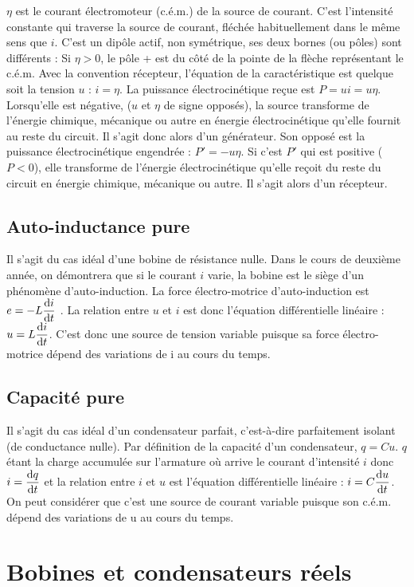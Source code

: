 $\eta$ est le courant électromoteur (c.é.m.) de la source de courant. C'est l'intensité constante qui traverse la source de courant, fléchée habituellement dans le même sens que $i$.
C'est un dipôle actif, non symétrique, ses deux bornes (ou pôles) sont différents : Si $\eta > 0$, le pôle + est du côté de la pointe de la flèche représentant le c.é.m. Avec la convention récepteur, l'équation de la caractéristique est quelque soit la tension $u$ : $i=\eta$. La puissance électrocinétique reçue est $P  = u i = u \eta$. Lorsqu'elle est négative, ($u$ et $\eta$ de signe opposés), la source transforme de l'énergie chimique, mécanique ou autre en énergie électrocinétique qu'elle fournit au reste du circuit. Il s'agit donc alors d'un générateur. Son opposé est la puissance électrocinétique engendrée : $P' = -u\eta$. Si c'est $P'$ qui est positive ($P  < 0$), elle transforme de l'énergie électrocinétique qu'elle reçoit du reste du circuit en énergie chimique, mécanique ou autre. Il s'agit alors d'un récepteur.

\subsection{Auto-inductance pure}

Il s'agit du cas idéal d'une bobine de résistance nulle. Dans le cours de deuxième année, on démontrera que si le courant $i$ varie, la bobine est le siège d'un phénomène d'auto-induction. La force électro-motrice d'auto-induction est $e = -L\dfrac{\mathrm{d} i}{\mathrm{d} t}$ . La relation entre $u$ et $i$ est donc l'équation différentielle linéaire : $u = L\dfrac{\mathrm{d} i}{\mathrm{d} t}$. C'est donc une source de tension variable puisque sa force électro-motrice dépend des variations de i au cours du temps.

\subsection{Capacité pure}

Il s'agit du cas idéal d'un condensateur parfait, c'est-à-dire parfaitement isolant (de conductance nulle). Par définition de la capacité d'un condensateur, $q=Cu$. $q$ étant la charge accumulée sur l'armature où arrive le courant d'intensité $i$ donc $i = \dfrac{\mathrm{d} q}{\mathrm{d} t}$  et la relation entre $i$ et $u$ est l'équation différentielle linéaire : $i=C\dfrac{\mathrm{d} u}{\mathrm{d} t}$. On peut considérer que c'est une source de courant variable puisque son c.é.m. dépend des variations de u au cours du temps.

\section{Bobines et condensateurs réels}

